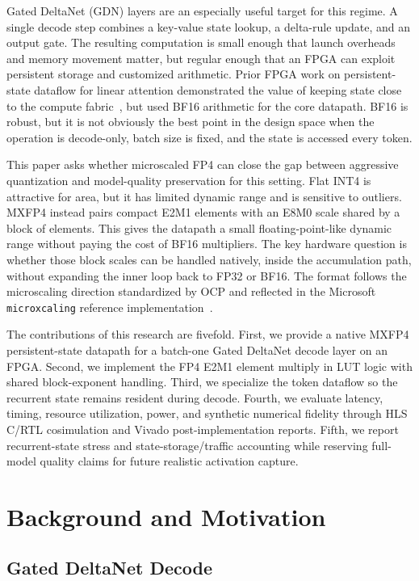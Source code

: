 \documentclass[conference]{IEEEtran}
\begin{document}
Gated DeltaNet (GDN) layers are an especially useful target for this regime. A
single decode step combines a key-value state lookup, a delta-rule update, and an
output gate. The resulting computation is small enough that launch overheads and
memory movement matter, but regular enough that an FPGA can exploit persistent
storage and customized arithmetic. Prior FPGA work on persistent-state dataflow
for linear attention demonstrated the value of keeping state close to the
compute fabric~\cite{usc_linear_attention_fpga}, but used BF16 arithmetic for
the core datapath. BF16 is robust, but it is not obviously the best point in the
design space when the operation is decode-only, batch size is fixed, and the
state is accessed every token.

This paper asks whether microscaled FP4 can close the gap between aggressive
quantization and model-quality preservation for this setting. Flat INT4 is
attractive for area, but it has limited dynamic range and is sensitive to
outliers. MXFP4 instead pairs compact E2M1 elements with an E8M0 scale shared by
a block of elements. This gives the datapath a small floating-point-like dynamic
range without paying the cost of BF16 multipliers. The key hardware question is
whether those block scales can be handled natively, inside the accumulation
path, without expanding the inner loop back to FP32 or BF16. The format follows
the microscaling direction standardized by OCP and reflected in the Microsoft
\texttt{microxcaling} reference implementation~\cite{ocp_mx,microxcaling}.

The contributions of this research are fivefold. First, we provide a native
MXFP4 persistent-state datapath for a batch-one Gated DeltaNet decode layer on
an FPGA. Second, we implement the FP4 E2M1 element multiply in LUT logic with
shared block-exponent handling. Third, we specialize the token dataflow so the
recurrent state remains resident during decode. Fourth, we evaluate latency,
timing, resource utilization, power, and synthetic numerical fidelity through
HLS C/RTL cosimulation and Vivado post-implementation reports. Fifth, we report
recurrent-state stress and state-storage/traffic accounting while reserving
full-model quality claims for future realistic activation capture.

\section{Background and Motivation}

\subsection{Gated DeltaNet Decode}
\end{document}
